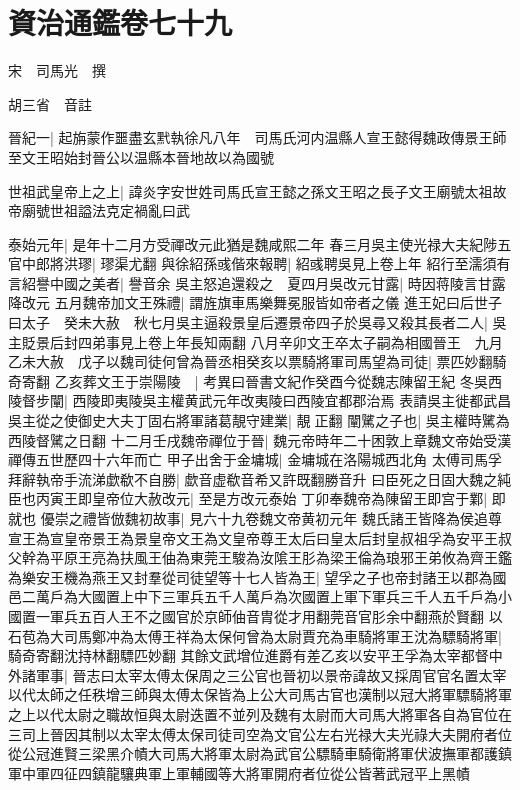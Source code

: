 \section{資治通鑑卷七十九}
宋　司馬光　撰

胡三省　音註

晉紀一|{
	起旃蒙作噩盡玄黓執徐凡八年　司馬氏河内温縣人宣王懿得魏政傳景王師至文王昭始封晉公以温縣本晉地故以為國號}


世祖武皇帝上之上|{
	諱炎字安世姓司馬氏宣王懿之孫文王昭之長子文王廟號太祖故帝廟號世祖謚法克定禍亂曰武}


泰始元年|{
	是年十二月方受禪改元此猶是魏咸熙二年}
春三月吳主使光禄大夫紀陟五官中郎將洪璆|{
	璆渠尤翻}
與徐紹孫彧偕來報聘|{
	紹彧聘吳見上卷上年}
紹行至濡須有言紹譽中國之美者|{
	譽音余}
吳主怒追還殺之　夏四月吳改元甘露|{
	時因蒋陵言甘露降改元}
五月魏帝加文王殊禮|{
	謂旌旗車馬樂舞冕服皆如帝者之儀}
進王妃曰后世子曰太子　癸未大赦　秋七月吳主逼殺景皇后遷景帝四子於吳尋又殺其長者二人|{
	吳主貶景后封四弟事見上卷上年長知兩翻}
八月辛卯文王卒太子嗣為相國晉王　九月乙未大赦　戊子以魏司徒何曾為晉丞相癸亥以票騎將軍司馬望為司徒|{
	票匹妙翻騎奇寄翻}
乙亥葬文王于崇陽陵　|{
	考異曰晉書文紀作癸酉今從魏志陳留王紀}
冬吳西陵督步闡|{
	西陵即夷陵吳主權黄武元年改夷陵曰西陵宜都郡治焉}
表請吳主徙都武昌吳主從之使御史大夫丁固右將軍諸葛靚守建業|{
	靚正翻}
闡騭之子也|{
	吳主權時騭為西陵督騭之日翻}
十二月壬戌魏帝禪位于晉|{
	魏元帝時年二十困敦上章魏文帝始受漢禪傳五世歷四十六年而亡}
甲子出舍于金墉城|{
	金墉城在洛陽城西北角}
太傅司馬孚拜辭執帝手流涕歔欷不自勝|{
	歔音虚欷音希又許既翻勝音升}
曰臣死之日固大魏之純臣也丙寅王即皇帝位大赦改元|{
	至是方改元泰始}
丁卯奉魏帝為陳留王即宫于鄴|{
	即就也}
優崇之禮皆倣魏初故事|{
	見六十九卷魏文帝黄初元年}
魏氏諸王皆降為侯追尊宣王為宣皇帝景王為景皇帝文王為文皇帝尊王太后曰皇太后封皇叔祖孚為安平王叔父幹為平原王亮為扶風王伷為東莞王駿為汝隂王肜為梁王倫為琅邪王弟攸為齊王鑑為樂安王機為燕王又封羣從司徒望等十七人皆為王|{
	望孚之子也帝封諸王以郡為國邑二萬戶為大國置上中下三軍兵五千人萬戶為次國置上軍下軍兵三千人五千戶為小國置一軍兵五百人王不之國官於京師伷音胄從才用翻莞音官肜余中翻燕於賢翻}
以石苞為大司馬鄭冲為太傅王祥為太保何曾為太尉賈充為車騎將軍王沈為驃騎將軍|{
	騎奇寄翻沈持林翻驃匹妙翻}
其餘文武增位進爵有差乙亥以安平王孚為太宰都督中外諸軍事|{
	晉志曰太宰太傅太保周之三公官也晉初以景帝諱故又採周官官名置太宰以代太師之任秩增三師與太傅太保皆為上公大司馬古官也漢制以冠大將軍驃騎將軍之上以代太尉之職故恒與太尉迭置不並列及魏有太尉而大司馬大將軍各自為官位在三司上晉因其制以太宰太傅太保司徒司空為文官公左右光禄大夫光祿大夫開府者位從公冠進賢三梁黑介幘大司馬大將軍太尉為武官公驃騎車騎衛將軍伏波撫軍都護鎮軍中軍四征四鎮龍驤典軍上軍輔國等大將軍開府者位從公皆著武冠平上黑幘}

